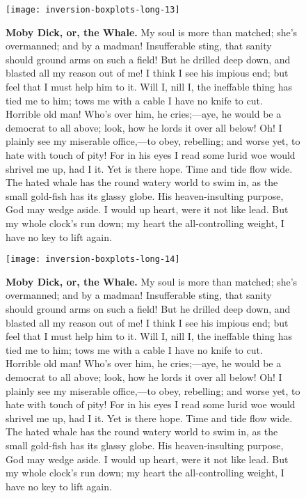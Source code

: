 \documentclass{article}
\begin{document}
\begin{figure}[!htp]
  \begin{center}
      \texttt{[image: inversion-boxplots-long-13]}
    \caption{
        \textbf{Moby Dick, or, the Whale.}
My soul is more than matched; she's overmanned; and by a madman! Insufferable sting, that sanity should ground arms on such a field! But he drilled deep down, and blasted all my reason out of me! I think I see his impious end; but feel that I must help him to it. Will I, nill I, the ineffable thing has tied me to him; tows me with a cable I have no knife to cut. Horrible old man! Who's over him, he cries;—aye, he would be a democrat to all above; look, how he lords it over all below! Oh! I plainly see my miserable office,—to obey, rebelling; and worse yet, to hate with touch of pity! For in his eyes I read some lurid woe would shrivel me up, had I it. Yet is there hope. Time and tide flow wide. The hated whale has the round watery world to swim in, as the small gold-fish has its glassy globe. His heaven-insulting purpose, God may wedge aside. I would up heart, were it not like lead. But my whole clock's run down; my heart the all-controlling weight, I have no key to lift again. 
    }
  \end{center}
\end{figure}

\begin{figure}[!htp]
  \begin{center}
      \texttt{[image: inversion-boxplots-long-14]}
    \caption{
        \textbf{Moby Dick, or, the Whale.}
My soul is more than matched; she's overmanned; and by a madman! Insufferable sting, that sanity should ground arms on such a field! But he drilled deep down, and blasted all my reason out of me! I think I see his impious end; but feel that I must help him to it. Will I, nill I, the ineffable thing has tied me to him; tows me with a cable I have no knife to cut. Horrible old man! Who's over him, he cries;—aye, he would be a democrat to all above; look, how he lords it over all below! Oh! I plainly see my miserable office,—to obey, rebelling; and worse yet, to hate with touch of pity! For in his eyes I read some lurid woe would shrivel me up, had I it. Yet is there hope. Time and tide flow wide. The hated whale has the round watery world to swim in, as the small gold-fish has its glassy globe. His heaven-insulting purpose, God may wedge aside. I would up heart, were it not like lead. But my whole clock's run down; my heart the all-controlling weight, I have no key to lift again. 
    }
  \end{center}
\end{figure}
\end{document}
